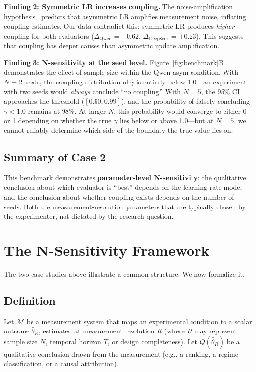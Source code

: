 \documentclass[11pt]{article}
\begin{document}
\textbf{Finding 2: Symmetric LR increases coupling.} The noise-amplification hypothesis~\cite{liu2026noise} predicts that asymmetric LR amplifies measurement noise, inflating coupling estimates. Our data contradict this: symmetric LR produces \emph{higher} coupling for both evaluators ($\Delta_{\text{Qwen}}{=}{+}0.62$, $\Delta_{\text{DeepSeek}}{=}{+}0.23$). This suggests that coupling has deeper causes than asymmetric update amplification.

\textbf{Finding 3: N-sensitivity at the seed level.} Figure~\ref{fig:benchmark}B demonstrates the effect of sample size within the Qwen-asym condition. With $N{=}2$ seeds, the sampling distribution of $\hat{\gamma}$ is entirely below 1.0---an experiment with two seeds would \emph{always} conclude ``no coupling.'' With $N{=}5$, the 95\% CI approaches the threshold ($[0.60, 0.99]$), and the probability of falsely concluding $\gamma < 1.0$ remains at 98\%. At larger $N$, this probability would converge to either 0 or 1 depending on whether the true $\gamma$ lies below or above 1.0---but at $N{=}5$, we cannot reliably determine which side of the boundary the true value lies on.

\subsection{Summary of Case 2}

This benchmark demonstrates \textbf{parameter-level N-sensitivity}: the qualitative conclusion about which evaluator is ``best'' depends on the learning-rate mode, and the conclusion about whether coupling exists depends on the number of seeds. Both are measurement-resolution parameters that are typically chosen by the experimenter, not dictated by the research question.

\section{The N-Sensitivity Framework}
\label{sec:framework}

The two case studies above illustrate a common structure. We now formalize it.

\subsection{Definition}

Let $\mathcal{M}$ be a measurement system that maps an experimental condition to a scalar outcome $\hat{\theta}_R$, estimated at measurement resolution $R$ (where $R$ may represent sample size $N$, temporal horizon $T$, or design completeness). Let $Q(\hat{\theta}_R)$ be a qualitative conclusion drawn from the measurement (e.g., a ranking, a regime classification, or a causal attribution).
\end{document}
